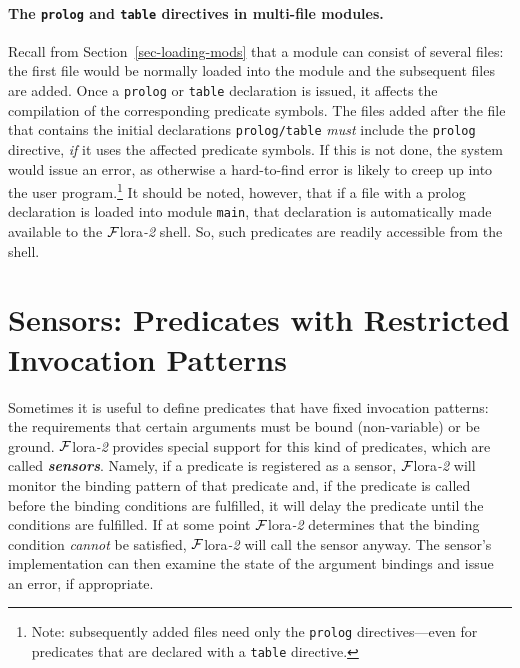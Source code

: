 \documentclass[11pt]{article}
\newcommand{\FLORA}{{\mbox{\sc ${\cal F}${lora}\rm\emph{-2}}}\xspace}
\begin{document}
\paragraph{The \texttt{prolog} and \texttt{table} directives in multi-file
  modules.}  
Recall from Section~\ref{sec-loading-mods} that a module can consist of
several files: the first file would be normally loaded into the module and
the subsequent files are added.
Once a \texttt{prolog} or \texttt{table} declaration is issued, it affects
the compilation of the corresponding predicate symbols. The files added
after the file that contains the initial declarations \texttt{prolog/table}
\emph{must} include
the \texttt{prolog} directive, \emph{if} it uses the affected predicate symbols.
If this is not done, the system would issue an error, as otherwise a
hard-to-find error is likely to creep up into the user program.\footnote{
  Note: subsequently added files need only the \texttt{prolog}
  directives---even for predicates that are declared with a \texttt{table}
  directive. 
  }
It should be noted, however, that if a file with a prolog declaration
is loaded into module \texttt{main}, that declaration is automatically made
available to the \FLORA shell. So, such predicates are readily accessible
from the shell. 


\section{Sensors: Predicates with Restricted Invocation Patterns}\label{sec-sensor}

Sometimes it is useful to define predicates that have fixed
invocation patterns: the requirements that certain arguments must be
bound (non-variable) or be ground.
\FLORA provides special support for this kind of predicates, which are
called \textbf{\emph{sensors}}. Namely, if a predicate is registered as a
sensor,
\FLORA will monitor the binding pattern of that predicate and, if the
predicate is called before the binding conditions are fulfilled, it will
delay the predicate until the conditions
are fulfilled. If  at some point \FLORA determines that
the binding condition \emph{cannot} be satisfied, \FLORA will call the sensor
anyway. The sensor's implementation
can then examine the state of the argument bindings and
issue an error, if appropriate.
\end{document}
